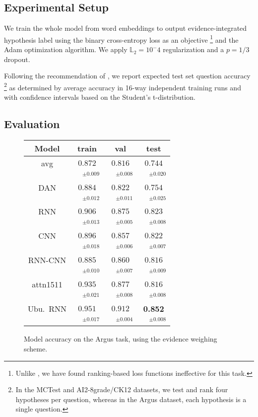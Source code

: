 \documentclass[11pt]{article}
\begin{document}
\subsection{Experimental Setup}

We train the whole model from word embeddings to output evidence-integrated
hypothesis label using the binary cross-entropy loss as an objective%
\footnote{Unlike \cite{HABCNN}, we have found ranking-based loss functions
	ineffective for this task.}
and the Adam optimization algorithm.  We apply $\mathbb{L}_2 = 10^-4$
regularization and a $p=1/3$ dropout.

Following the recommendation of \cite{sps}, we report expected test set
question accuracy%
\footnote{In the MCTest and AI2-8grade/CK12 datasets, we test and rank four
	hypotheses per question, whereas in the Argus dataset, each
	hypothesis is a single question.}
as determined by average accuracy in 16-way independent training runs
and with confidence intervals based on the Student's
t-distribution.

\subsection{Evaluation}

\begin{figure}[t]
\centering
\setlength{\tabcolsep}{3pt}
\begin{tabular}{|c|c|c|c|}
\hline
Model              & train & val & test \\
\hline
avg & $0.872$ & $0.816$ & $0.744$\\
 & $\quad^{\pm0.009}$ & $\quad^{\pm0.008}$ & $\quad^{\pm0.020}$\\
DAN & $0.884$ & $0.822$ & $0.754$\\
 & $\quad^{\pm0.012}$ & $\quad^{\pm0.011}$ & $\quad^{\pm0.025}$\\
\hline
RNN & $0.906$ & $0.875$ & $0.823$\\
 & $\quad^{\pm0.013}$ & $\quad^{\pm0.005}$ & $\quad^{\pm0.008}$\\
CNN & $0.896$ & $0.857$ & $0.822$\\
 & $\quad^{\pm0.018}$ & $\quad^{\pm0.006}$ & $\quad^{\pm0.007}$\\
RNN-CNN & $0.885$ & $0.860$ & $0.816$\\
 & $\quad^{\pm0.010}$ & $\quad^{\pm0.007}$ & $\quad^{\pm0.009}$\\
attn1511 & $0.935$ & $0.877$ & $0.816$\\
 & $\quad^{\pm0.021}$ & $\quad^{\pm0.008}$ & $\quad^{\pm0.008}$\\
Ubu.\ RNN & $0.951$ & $0.912$ & \textbf{0.852}\\
 & $\quad^{\pm0.017}$ & $\quad^{\pm0.004}$ & $\quad^{\pm0.008}$\\
\hline
\end{tabular}
\setlength{\tabcolsep}{6pt}
\vspace*{-0.2cm}
\caption{\footnotesize%
	Model accuracy on the Argus task, using the evidence weighing scheme.
}
\label{tab:argus}
\end{figure}
\end{document}
